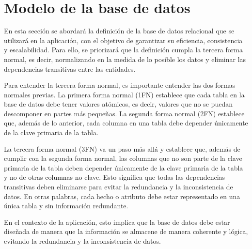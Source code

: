 
\section{Modelo de la base de datos}\label{sec:modelo-de-datos}

En esta sección se abordará la definición de la base de datos relacional que se utilizará en la aplicación, con el objetivo de garantizar su eficiencia, consistencia y escalabilidad. Para ello, se priorizará que la definición cumpla la tercera forma normal, es decir, normalizando en la medida de lo posible los datos y eliminar las dependencias transitivas entre las entidades.

Para entender la tercera forma normal, es importante entender las dos formas normales previas. La primera forma normal (1FN) establece que cada tabla en la base de datos debe tener valores atómicos, es decir, valores que no se puedan descomponer en partes más pequeñas. La segunda forma normal (2FN) establece que, además de lo anterior, cada columna en una tabla debe depender únicamente de la clave primaria de la tabla.

La tercera forma normal (3FN) va un paso más allá y establece que, además de cumplir con la segunda forma normal, las columnas que no son parte de la clave primaria de la tabla deben depender únicamente de la clave primaria de la tabla y no de otras columnas no clave. Esto significa que todas las dependencias transitivas deben eliminarse para evitar la redundancia y la inconsistencia de datos. En otras palabras, cada hecho o atributo debe estar representado en una única tabla y sin información redundante.

En el contexto de la aplicación, esto implica que la base de datos debe estar diseñada de manera que la información se almacene de manera coherente y lógica, evitando la redundancia y la inconsistencia de datos.